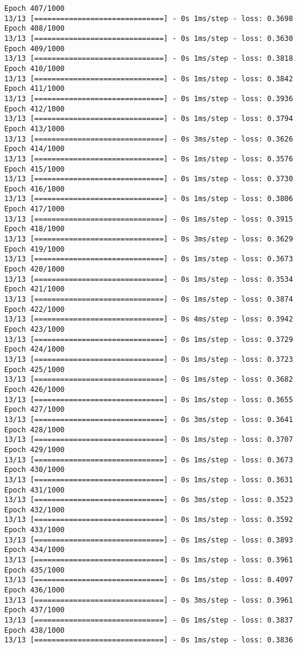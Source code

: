 \documentclass[11pt]{article}
\begin{document}
\begin{Verbatim}[commandchars=\\\{\}]
Epoch 407/1000
13/13 [==============================] - 0s 1ms/step - loss: 0.3698
Epoch 408/1000
13/13 [==============================] - 0s 1ms/step - loss: 0.3630
Epoch 409/1000
13/13 [==============================] - 0s 1ms/step - loss: 0.3818
Epoch 410/1000
13/13 [==============================] - 0s 1ms/step - loss: 0.3842
Epoch 411/1000
13/13 [==============================] - 0s 1ms/step - loss: 0.3936
Epoch 412/1000
13/13 [==============================] - 0s 1ms/step - loss: 0.3794
Epoch 413/1000
13/13 [==============================] - 0s 3ms/step - loss: 0.3626
Epoch 414/1000
13/13 [==============================] - 0s 1ms/step - loss: 0.3576
Epoch 415/1000
13/13 [==============================] - 0s 1ms/step - loss: 0.3730
Epoch 416/1000
13/13 [==============================] - 0s 1ms/step - loss: 0.3806
Epoch 417/1000
13/13 [==============================] - 0s 1ms/step - loss: 0.3915
Epoch 418/1000
13/13 [==============================] - 0s 3ms/step - loss: 0.3629
Epoch 419/1000
13/13 [==============================] - 0s 1ms/step - loss: 0.3673
Epoch 420/1000
13/13 [==============================] - 0s 1ms/step - loss: 0.3534
Epoch 421/1000
13/13 [==============================] - 0s 1ms/step - loss: 0.3874
Epoch 422/1000
13/13 [==============================] - 0s 4ms/step - loss: 0.3942
Epoch 423/1000
13/13 [==============================] - 0s 1ms/step - loss: 0.3729
Epoch 424/1000
13/13 [==============================] - 0s 1ms/step - loss: 0.3723
Epoch 425/1000
13/13 [==============================] - 0s 1ms/step - loss: 0.3682
Epoch 426/1000
13/13 [==============================] - 0s 1ms/step - loss: 0.3655
Epoch 427/1000
13/13 [==============================] - 0s 3ms/step - loss: 0.3641
Epoch 428/1000
13/13 [==============================] - 0s 1ms/step - loss: 0.3707
Epoch 429/1000
13/13 [==============================] - 0s 1ms/step - loss: 0.3673
Epoch 430/1000
13/13 [==============================] - 0s 1ms/step - loss: 0.3631
Epoch 431/1000
13/13 [==============================] - 0s 3ms/step - loss: 0.3523
Epoch 432/1000
13/13 [==============================] - 0s 1ms/step - loss: 0.3592
Epoch 433/1000
13/13 [==============================] - 0s 1ms/step - loss: 0.3893
Epoch 434/1000
13/13 [==============================] - 0s 1ms/step - loss: 0.3961
Epoch 435/1000
13/13 [==============================] - 0s 1ms/step - loss: 0.4097
Epoch 436/1000
13/13 [==============================] - 0s 3ms/step - loss: 0.3961
Epoch 437/1000
13/13 [==============================] - 0s 1ms/step - loss: 0.3837
Epoch 438/1000
13/13 [==============================] - 0s 1ms/step - loss: 0.3836

\end{Verbatim}
\end{document}
